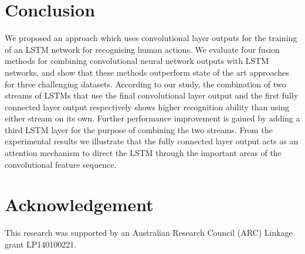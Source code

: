 \documentclass[10pt,twocolumn,letterpaper]{article}
\begin{document}
\section{Conclusion} 

  We proposed an approach which uses convolutional layer outputs for the training of an LSTM network for recognising human actions. We evaluate four fusion methods for combining convolutional neural network outputs with LSTM networks, and show that these methods outperform state of the art approaches for three challenging datasets. According to our study, the combination of two streams of LSTMs that use the final convolutional layer output and the first fully connected layer output respectively shows higher recognition ability than using either stream on its own. Further performance improvement is gained by adding a third LSTM layer for the purpose of combining the two streams. From the experimental results we illustrate that the fully connected layer output acts as an attention mechanism to direct the LSTM through the important areas of the convolutional feature sequence.


\section*{Acknowledgement}
This research was supported by an Australian Research Council (ARC) Linkage grant LP140100221.  
  
 


{\small


}
\end{document}
